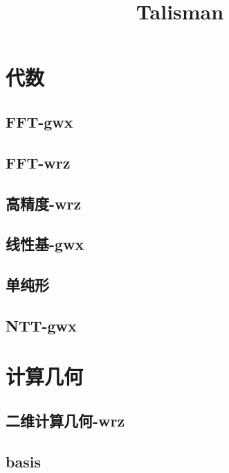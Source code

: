 \documentclass[titlepage,a4paper,10pt]{article}
\title{Talisman}
\begin{document}
	\maketitle
		\setcounter{tocdepth}{3}
		\begingroup
		\let\cleardoublepage\relax
		\let\clearpage\relax
		\renewcommand{\contentsname}{目录}
		\tableofcontents
		\newpage
		\begin{spacing}{0.8}
		\footnotesize
		\section{代数}
			\subsection{FFT-gwx}
				
			\subsection{FFT-wrz}
				
			\subsection{高精度-wrz}
				
			\subsection{线性基-gwx}
				
			\subsection{单纯形}
				
			\subsection{NTT-gwx}
				
		\section{计算几何}
			\subsection{二维计算几何-wrz}
				
			\subsection{basis}
				

\end{spacing}
\end{document}
